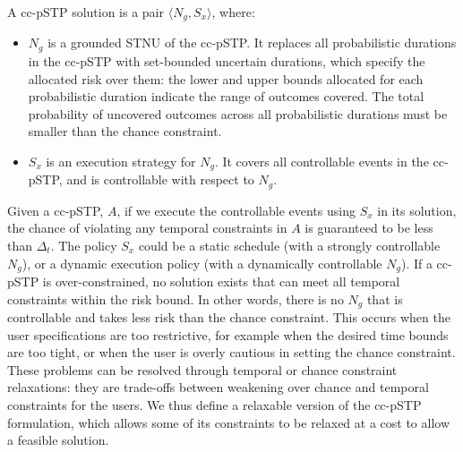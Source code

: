 \documentclass[jair,twoside,11pt,theapa]{article}
\begin{document}
\begin{mydef}
	
	A cc-pSTP solution is a pair $\langle N_g,S_{x}\rangle$, where:
	
	\begin{itemize}
		
		\item $N_g$ is a grounded STNU of the cc-pSTP. It replaces all probabilistic
		durations in the cc-pSTP with set-bounded uncertain durations, which specify
		the allocated risk over them: the lower and upper bounds allocated for each
		probabilistic duration indicate the range of outcomes covered. The total
		probability of uncovered outcomes across all probabilistic durations must be
		smaller than the chance constraint.
		
		\item $S_x$ is an execution strategy for $N_g$. It covers all controllable
		events in the cc-pSTP, and is controllable with respect to $N_g$. 
		
	\end{itemize}
	
\end{mydef}


Given a cc-pSTP, $A$, if we execute the
controllable events using $S_x$ in its solution, the chance of violating any
temporal constraints in $A$ is guaranteed to be less than $\Delta_t$. The policy
$S_x$ could be a static schedule (with a strongly controllable $N_g$), or a
dynamic execution policy (with a dynamically controllable $N_g$). If a cc-pSTP
is over-constrained, no solution exists that can meet all temporal constraints
within the risk bound. In other words, there is no $N_g$ that is
controllable and takes less risk than the chance constraint. This occurs when
the user specifications are too restrictive, for example when the desired time
bounds are too tight, or when the user is overly cautious in setting the chance
constraint. These problems can be resolved through temporal or chance constraint
relaxations: they are trade-offs between
weakening over chance and temporal constraints for the users. We
thus define a relaxable version of the cc-pSTP formulation, which allows some of
its constraints to be relaxed at a cost to allow a feasible solution. 
\end{document}
